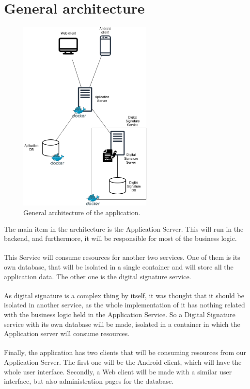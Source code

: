 \documentclass[./main.tex]{subfiles}
\begin{document}
\hypertarget{general-architecture}{%
\section{General architecture}\label{general-architecture}}

\begin{figure}[H]
\centering
\includegraphics[width=0.6\textwidth]{architecture_diagram/Architecture.drawio.png}
\caption{General architecture of the application.}
\end{figure}
The main item in the architecture is the Application Server. This 
will run in the backend, and furthermore, it will be
responsible for most of the business logic.
\\
\\
This Service will consume resources for another two services. One of
them is its own database, that will be isolated in a single container
and will store all the application data. The other one is the digital
signature service.
\\
\\
As digital signature is a complex thing by itself, it was thought that
it should be isolated in another service, as the whole implementation of
it has nothing related with the business logic held in the Application
Service. So a Digital Signature service with its own database will be
made, isolated in a container in which the Application server will
consume resources.
\\
\\
Finally, the application has two clients that will be consuming
resources from our Application Server. The first one will be the Android
client, which will have the whole user interface. Secondly, a Web client
will be made with a similar user interface, but also administration
pages for the database.

\end{document}
